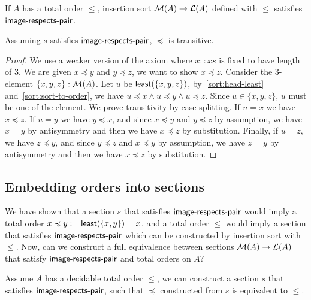\begin{proposition}
    If $A$ has a total order $\leq$, insertion sort $\mathcal{M}(A) \to \mathcal{L}(A)$ defined with $\leq$
    satisfies $\operatorname{\mathsf{image-respects-pair}}$.
\end{proposition}

\begin{proposition}\label{sort:trans}
    Assuming $s$ satisfies $\operatorname{\mathsf{image-respects-pair}}$, $\preccurlyeq$ is transitive.
\end{proposition}
\begin{proof}
    We use a weaker version of the axiom where $x :: xs$ is fixed to have length of 3.
    We are given $x \preccurlyeq y$ and $y \preccurlyeq z$, we want to show $x \preccurlyeq z$.
    Consider the 3-element $\{x,y,z\} : \mathcal{M}(A)$. Let $u$ be $\operatorname{\mathsf{least}}(\{x,y,z\})$,
    by~\cref{sort:head-least} and~\cref{sort:sort-to-order},
    we have $u \preccurlyeq x \land u \preccurlyeq y \land u \preccurlyeq z$.
    Since $u \in \{x,y,z\}$, $u$ must be one of the element. We prove transitivity by case splitting.
    If $u = x$ we have $x \preccurlyeq z$. If $u = y$ we have $y \preccurlyeq x$, and since
    $x \preccurlyeq y$ and $y \preccurlyeq z$ by assumption,
    we have $x = y$ by antisymmetry and then we have $x \preccurlyeq z$ by substitution.
    Finally, if $u = z$, we have $z \preccurlyeq y$, and since
    $y \preccurlyeq z$ and $x \preccurlyeq y$ by assumption,
    we have $z = y$ by antisymmetry and then we have $x \preccurlyeq z$ by substitution.
\end{proof}

\subsection{Embedding orders into sections}

We have shown that a section $s$ that satisfies $\operatorname{\mathsf{image-respects-pair}}$ would imply a total order
$x \preccurlyeq y := \operatorname{\mathsf{least}}(\{x, y\}) = x$,
and a total order $\leq$ would imply a section that satisfies $\operatorname{\mathsf{image-respects-pair}}$ which can
be constructed by insertion sort with $\leq$. Now, can we construct a full equivalence
between sections $\mathcal{M}(A) \to \mathcal{L}(A)$ that satisfy $\operatorname{\mathsf{image-respects-pair}}$ and total orders on $A$?

\begin{proposition}\label{sort:o2s2o}
    Assume $A$ has a decidable total order $\leq$, we can construct a section $s$ that
    satisfies $\operatorname{\mathsf{image-respects-pair}}$, such that $\preccurlyeq$ constructed from $s$ is equivalent
    to $\leq$.
\end{proposition}

